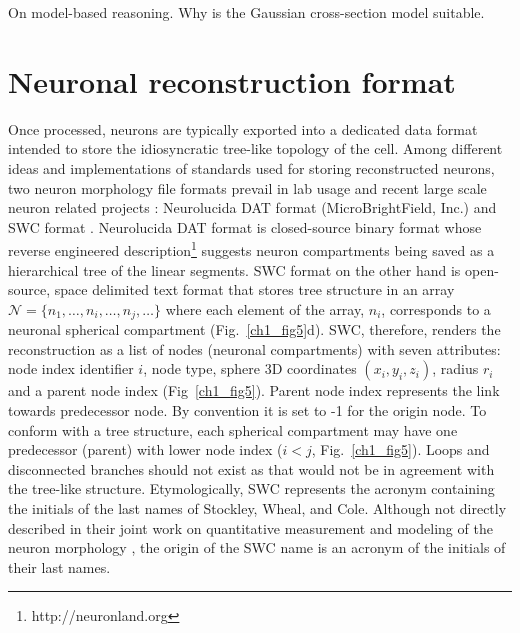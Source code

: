 On model-based reasoning. Why is the Gaussian cross-section model \cite{zhao2011automated,radojevic2017neuron} suitable.

\section{Neuronal reconstruction format}
\label{ch1_sec4}
Once processed, neurons are typically exported into a dedicated data format intended to store the idiosyncratic tree-like topology of the cell. Among different ideas and implementations of standards used for storing reconstructed neurons, two neuron morphology file formats prevail in lab usage and recent large scale neuron related projects \cite{bakker2016web}: Neurolucida DAT format (MicroBrightField, Inc.) and SWC format \cite{cannon1998line}. Neurolucida DAT format is closed-source binary format whose reverse engineered description\footnote{http://neuronland.org} suggests neuron compartments being saved as a hierarchical tree of the linear segments. SWC format on the other hand is open-source, space delimited text format that stores tree structure in an array $\mathcal{N} = \{ n_1, \dots , n_i, \dots , n_j, \dots  \}$ where each element of the array, $n_i$, corresponds to a neuronal spherical compartment (Fig.~\ref{ch1_fig5}d). SWC, therefore, renders the reconstruction as a list of nodes (neuronal compartments) with seven attributes: node index identifier $i$, node type, sphere 3D coordinates $(x_i,y_i,z_i)$, radius $r_i$ and a parent node index (Fig~\ref{ch1_fig5}). Parent node index represents the link towards predecessor node. By convention it is set to -1 for the origin node. To conform with a tree structure, each spherical compartment may have one predecessor (parent) with lower node index ($i<j$, Fig.~\ref{ch1_fig5}). Loops and disconnected branches should not exist as that would not be in agreement with the tree-like structure. Etymologically, SWC represents the acronym containing the initials of the last names of Stockley, Wheal, and Cole. Although not directly described in their joint work on quantitative measurement and modeling of the neuron morphology \cite{stockley1993system}, the origin of the SWC name is an acronym of the initials of their last names. 

